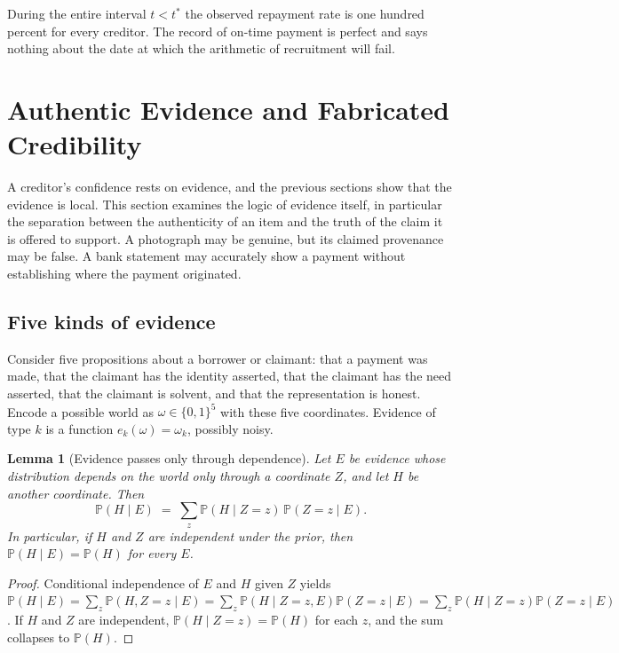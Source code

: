 \documentclass[11pt]{article}
\newtheorem{lemma}[theorem]{Lemma}
\theoremstyle{definition}
\theoremstyle{remark}
\newcommand{\Prob}{\mathbb{P}}
\begin{document}
During the entire interval $t<t^\ast$ the observed repayment rate is one hundred percent for every creditor. The record of on-time payment is perfect and says nothing about the date at which the arithmetic of recruitment will fail.

\section{Authentic Evidence and Fabricated Credibility}\label{sec:evidence}

A creditor's confidence rests on evidence, and the previous sections show that the evidence is local. This section examines the logic of evidence itself, in particular the separation between the authenticity of an item and the truth of the claim it is offered to support. A photograph may be genuine, but its claimed provenance may be false. A bank statement may accurately show a payment without establishing where the payment originated.

\subsection{Five kinds of evidence}

Consider five propositions about a borrower or claimant: that a payment was made, that the claimant has the identity asserted, that the claimant has the need asserted, that the claimant is solvent, and that the representation is honest. Encode a possible world as $\omega\in\{0,1\}^5$ with these five coordinates. Evidence of type $k$ is a function $e_k(\omega)=\omega_k$, possibly noisy.

\begin{lemma}[Evidence passes only through dependence]\label{lem:dependence}
Let $E$ be evidence whose distribution depends on the world only through a coordinate $Z$, and let $H$ be another coordinate. Then
\[
\Prob(H\mid E)\;=\;\sum_{z}\Prob(H\mid Z=z)\,\Prob(Z=z\mid E).
\]
In particular, if $H$ and $Z$ are independent under the prior, then $\Prob(H\mid E)=\Prob(H)$ for every $E$.
\end{lemma}

\begin{proof}
Conditional independence of $E$ and $H$ given $Z$ yields $\Prob(H\mid E)=\sum_z\Prob(H,Z=z\mid E)=\sum_z\Prob(H\mid Z=z,E)\Prob(Z=z\mid E)=\sum_z\Prob(H\mid Z=z)\Prob(Z=z\mid E)$. If $H$ and $Z$ are independent, $\Prob(H\mid Z=z)=\Prob(H)$ for each $z$, and the sum collapses to $\Prob(H)$.
\end{proof}
\end{document}
